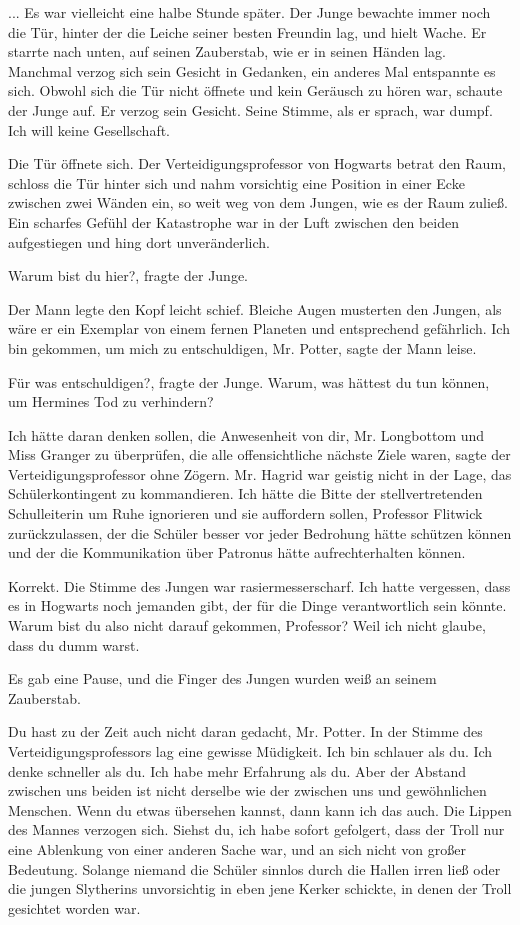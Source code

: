 ... Es war vielleicht eine halbe Stunde später. Der Junge bewachte immer noch
die Tür, hinter der die Leiche seiner besten Freundin lag, und hielt Wache. Er
starrte nach unten, auf seinen Zauberstab, wie er in seinen Händen lag. Manchmal
verzog sich sein Gesicht in Gedanken, ein anderes Mal entspannte es sich. Obwohl
sich die Tür nicht öffnete und kein Geräusch zu hören war, schaute der Junge
auf. Er verzog sein Gesicht. Seine Stimme, als er sprach, war dumpf. \glqq{}Ich
will keine Gesellschaft.\grqq{}

Die Tür öffnete sich. Der Verteidigungsprofessor von Hogwarts betrat den Raum,
schloss die Tür hinter sich und nahm vorsichtig eine Position in einer Ecke
zwischen zwei Wänden ein, so weit weg von dem Jungen, wie es der Raum zuließ.
Ein scharfes Gefühl der Katastrophe war in der Luft zwischen den beiden
aufgestiegen und hing dort unveränderlich.

\glqq{}Warum bist du hier?\grqq{}, fragte der Junge.

Der Mann legte den Kopf leicht schief. Bleiche Augen musterten den Jungen, als
wäre er ein Exemplar von einem fernen Planeten und entsprechend gefährlich.
\glqq{}Ich bin gekommen, um mich zu entschuldigen, Mr. Potter\grqq{}, sagte der
Mann leise.

\glqq{}Für was entschuldigen?\grqq{}, fragte der Junge. \glqq{}Warum, was hättest
du tun können, um Hermines Tod zu verhindern?\grqq{}

\glqq{}Ich hätte daran denken sollen, die Anwesenheit von dir, Mr. Longbottom und
Miss Granger zu überprüfen, die alle offensichtliche nächste Ziele waren\grqq{},
sagte der Verteidigungsprofessor ohne Zögern. \glqq{}Mr. Hagrid war geistig nicht
in der Lage, das Schülerkontingent zu kommandieren. Ich hätte die Bitte der
stellvertretenden Schulleiterin um Ruhe ignorieren und sie auffordern sollen,
Professor Flitwick zurückzulassen, der die Schüler besser vor jeder Bedrohung
hätte schützen können und der die Kommunikation über Patronus hätte
aufrechterhalten können.\grqq{}

\glqq{}Korrekt.\grqq{} Die Stimme des Jungen war rasiermesserscharf. \glqq{}Ich
hatte vergessen, dass es in Hogwarts noch jemanden gibt, der für die Dinge
verantwortlich sein könnte. Warum bist du also nicht darauf gekommen, Professor?
Weil ich nicht glaube, dass du dumm warst.\grqq{}

Es gab eine Pause, und die Finger des Jungen wurden weiß an seinem Zauberstab.

\glqq{}Du hast zu der Zeit auch nicht daran gedacht, Mr. Potter.\grqq{} In der
Stimme des Verteidigungsprofessors lag eine gewisse Müdigkeit. \glqq{}Ich bin
schlauer als du. Ich denke schneller als du. Ich habe mehr Erfahrung als du.
Aber der Abstand zwischen uns beiden ist nicht derselbe wie der zwischen uns und
gewöhnlichen Menschen. Wenn du etwas übersehen kannst, dann kann ich das
auch.\grqq{} Die Lippen des Mannes verzogen sich. \glqq{}Siehst du, ich habe
sofort gefolgert, dass der Troll nur eine Ablenkung von einer anderen Sache war,
und an sich nicht von großer Bedeutung. Solange niemand die Schüler sinnlos
durch die Hallen irren ließ oder die jungen Slytherins unvorsichtig in eben jene
Kerker schickte, in denen der Troll gesichtet worden war.\grqq{}

